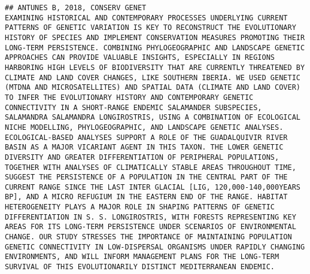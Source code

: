 \documentclass[]{article}
\begin{document}
\begin{verbatim}
## ANTUNES B, 2018, CONSERV GENET                                                                                                                                                                                                                                                                                                                                                                                                                                                                                      EXAMINING HISTORICAL AND CONTEMPORARY PROCESSES UNDERLYING CURRENT PATTERNS OF GENETIC VARIATION IS KEY TO RECONSTRUCT THE EVOLUTIONARY HISTORY OF SPECIES AND IMPLEMENT CONSERVATION MEASURES PROMOTING THEIR LONG-TERM PERSISTENCE. COMBINING PHYLOGEOGRAPHIC AND LANDSCAPE GENETIC APPROACHES CAN PROVIDE VALUABLE INSIGHTS, ESPECIALLY IN REGIONS HARBORING HIGH LEVELS OF BIODIVERSITY THAT ARE CURRENTLY THREATENED BY CLIMATE AND LAND COVER CHANGES, LIKE SOUTHERN IBERIA. WE USED GENETIC (MTDNA AND MICROSATELLITES) AND SPATIAL DATA (CLIMATE AND LAND COVER) TO INFER THE EVOLUTIONARY HISTORY AND CONTEMPORARY GENETIC CONNECTIVITY IN A SHORT-RANGE ENDEMIC SALAMANDER SUBSPECIES, SALAMANDRA SALAMANDRA LONGIROSTRIS, USING A COMBINATION OF ECOLOGICAL NICHE MODELLING, PHYLOGEOGRAPHIC, AND LANDSCAPE GENETIC ANALYSES. ECOLOGICAL-BASED ANALYSES SUPPORT A ROLE OF THE GUADALQUIVIR RIVER BASIN AS A MAJOR VICARIANT AGENT IN THIS TAXON. THE LOWER GENETIC DIVERSITY AND GREATER DIFFERENTIATION OF PERIPHERAL POPULATIONS, TOGETHER WITH ANALYSES OF CLIMATICALLY STABLE AREAS THROUGHOUT TIME, SUGGEST THE PERSISTENCE OF A POPULATION IN THE CENTRAL PART OF THE CURRENT RANGE SINCE THE LAST INTER GLACIAL [LIG, 120,000-140,000YEARS BP], AND A MICRO REFUGIUM IN THE EASTERN END OF THE RANGE. HABITAT HETEROGENEITY PLAYS A MAJOR ROLE IN SHAPING PATTERNS OF GENETIC DIFFERENTIATION IN S. S. LONGIROSTRIS, WITH FORESTS REPRESENTING KEY AREAS FOR ITS LONG-TERM PERSISTENCE UNDER SCENARIOS OF ENVIRONMENTAL CHANGE. OUR STUDY STRESSES THE IMPORTANCE OF MAINTAINING POPULATION GENETIC CONNECTIVITY IN LOW-DISPERSAL ORGANISMS UNDER RAPIDLY CHANGING ENVIRONMENTS, AND WILL INFORM MANAGEMENT PLANS FOR THE LONG-TERM SURVIVAL OF THIS EVOLUTIONARILY DISTINCT MEDITERRANEAN ENDEMIC.

\end{verbatim}
\end{document}
